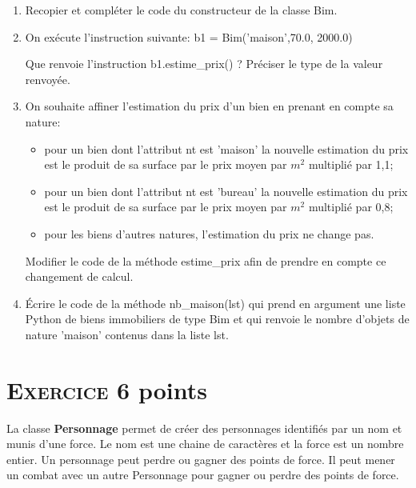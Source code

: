 \documentclass[11pt,a4paper]{article}
\newcounter{num}
\begin{document}
\begin{enumerate}
\item Recopier et compléter le code du constructeur de la classe \textsf{Bim}.

\item On exécute l'instruction suivante: \textsf{b1 = Bim('maison',70.0, 2000.0)}

Que renvoie l'instruction \textsf{b1.estime\_prix()} ? Préciser le type de la valeur renvoyée.

\item On souhaite affiner l'estimation du prix d'un bien en prenant en compte sa nature:

\begin{itemize}
\item pour un bien dont l'attribut \textsf{nt} est \textsf{'maison'} la nouvelle estimation du prix est le produit de sa surface par le prix moyen par $m^{2}$ multiplié par 1,1;
\item pour un bien dont l'attribut \textsf{nt} est \textsf{'bureau'} la nouvelle estimation du prix est le produit de sa surface par le prix moyen par $m^{2}$ multiplié par 0,8;
\item pour les biens d'autres natures, l'estimation du prix ne change pas.
\end{itemize}

Modifier le code de la méthode \textsf{estime\_prix} afin de prendre en compte ce changement de calcul.

\item Écrire le code de la méthode \textsf{nb\_maison(lst)} qui prend en argument une liste Python de biens immobiliers de type \textsf{Bim} et qui renvoie le nombre d'objets de nature \textsf{'maison'} contenus dans la liste \textsf{lst}.

\end{enumerate}
 



\newpage
\addtocounter{num}{1}
\section*{\textsc{Exercice \thenum } \hfill 6 points}
La classe \textbf{Personnage} permet de créer des personnages identifiés par un nom et munis d'une force. Le nom est une chaine de caractères et la force est un nombre entier. Un personnage peut perdre ou gagner des points de force. Il peut mener un combat avec un autre Personnage pour gagner ou perdre des points de force. \medskip
\end{document}
